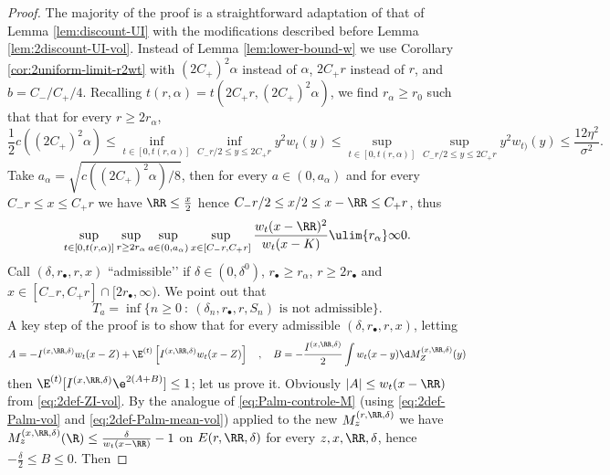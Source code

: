 \documentclass[10pt,a4paper]{article}
\begin{document}
\begin{proof}
The majority of the proof is a straightforward adaptation of that of Lemma \ref{lem:discount-UI} with the modifications described before Lemma \ref{lem:2discount-UI-vol}. 
Instead of Lemma \ref{lem:lower-bound-w} we use Corollary \ref{cor:2uniform-limit-r2wt} with $(2C_+)^2\alpha$ instead of $\alpha$, $2C_+ r$ instead of $r$, and $b=C_- / C_+ / 4$. Recalling $t(r,\alpha) = t(2C_+ r, (2C_+)^2 \alpha)$, we find $r_\alpha\geq r_0$ such that that for every $r\geq 2r_\alpha$, 
\[ \frac{1}{2}c((2C_+)^2\alpha) \leq \inf_{t\in [0,t(r,\alpha)]} \inf_{C_-r/2 \leq y \leq 2C_+r} y^2 w_{t}(y) \leq \sup_{t\in [0,t(r,\alpha)]} \sup_{C_-r/2 \leq y \leq 2C_+r} y^2 w_{t)}(y) \leq \frac{12 \eta^2}{\sigma^2} . \]
Take $a_\alpha = \sqrt{c((2C_+)^2\alpha)/8}$, then for every $a \in (0,a_\alpha)$ and for every $C_- r \leq x \leq C_+ r$ we have $\RR \leq \frac{x}{2}$ hence $C_- r/2 \leq x/2 \leq x-\RR \leq C_+ r$, thus 
\begin{equation}\label{eq:wt2-over-wt-goes-to-zero}
\sup_{t\in [0,t(r,\alpha)]} \sup_{r\geq 2r_\alpha} \sup_{a\in (0,a_\alpha)} \sup_{x\in [C_-r, C_+r]} \frac{w_{t}(x-\RR)^2}{w_{t}(x-K)} 
\ulim {r_\alpha} \infty 0 .
\end{equation}
%
Call $(\delta, r_\bullet, r, x)$ ``admissible’’ if $\delta\in (0,\delta^0)$, $r_\bullet \geq r_\alpha$, $r\geq 2r_\bullet$ and $x \in [C_-r, C_+r] \cap [2r_\bullet, \infty)$. 
We point out that 
\begin{equation}\label{eq:Ta-is-admissible}
T_a = \inf \{ n\geq 0 \ : \ (\delta_n, r_\bullet, r, S_n) \text{ is not admissible} \} .
\end{equation}
A key step of the proof is to show that for every admissible $(\delta, r_\bullet, r, x)$, letting
\[ A = - I^{(x,\RR,\delta)}w_t(x-Z) + \E^{(t)}\left[I^{(x,\RR,\delta)} w_t(x-Z)\right] \quad , \quad B = - \frac{I^{(x,\RR,\delta)}} 2 \int w_t(x-y) \d M_Z^{(x,\RR,\delta)}(y) \]
then $\E^{(t)}[I^{(x, \RR, \delta)} \e^{2(A+B)}] \leq 1$; let us prove it. 
Obviously $|A|\leq w_t(x-\RR)$ from \eqref{eq:2def-ZI-vol}. 
By the analogue of \eqref{eq:Palm-controle-M} (using \eqref{eq:2def-Palm-vol} and \eqref{eq:2def-Palm-mean-vol}) applied to the new $M_z^{(r,\RR,\delta)}$ we have $M_z^{(x,\RR,\delta)}(\R) \leq \frac{\delta}{w_t(x-\RR)}-1$ on $E(r,\RR,\delta)$ for every $z, x, \RR, \delta$, hence $-\frac\delta 2 \leq B\leq 0$. Then

\end{proof}
\end{document}
